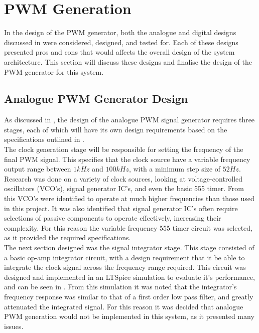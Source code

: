     
\section{PWM Generation}\label{S:pwm_gen}

In the design of the PWM generator, both the analogue and digital designs discussed in  were considered, designed, and tested for. Each of these designs presented pros and cons that would affects the overall design of the system architecture. This section will discuss these designs and finalise the design of the PWM generator for this system. 

\subsection{Analogue PWM Generator Design}\label{S:analogue_design}

As discussed in , the design of the analogue PWM signal generator requires three stages, each of which will have its own design requirements based on the specifications outlined in . \\

The clock generation stage will be responsible for setting the frequency of the final PWM signal. This specifies that the clock source have a variable frequency output range between $1kHz$ and $100kHz$, with a minimum step size of $52Hz$. Research was done on a variety of clock sources, looking at voltage-controlled oscillators (VCO's), signal generator IC's, and even the basic 555 timer. From this VCO's were identified to operate at much higher frequencies than those used in this project. It was also identified that signal generator IC's often require selections of passive components to operate effectively, increasing their complexity. For this reason the variable frequency 555 timer circuit was selected, as it provided the required specifications.\\

The next section designed was the signal integrator stage. This stage consisted of a basic op-amp integrator circuit, with a design requirement that it be able to integrate the clock signal across the frequency range required. This circuit was designed and implemented in an LTSpice simulation to evaluate it's performance, and can be seen in . From this simulation it was noted that the integrator's frequency response was similar to that of a first order low pass filter, and greatly attenuated the integrated signal. For this reason it was decided that analogue PWM generation would not be implemented in this system, as it presented many issues.

